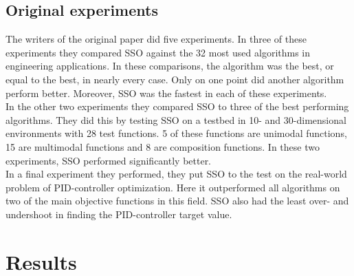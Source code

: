 \documentclass[runningheads]{llncs}
\begin{document}
\subsection{Original experiments}
The writers of the original paper did five experiments. In three of these experiments they compared SSO against the 32 most used algorithms in engineering applications. In these comparisons, the algorithm was the best, or equal to the best, in nearly every case. Only on one point did another algorithm perform better. Moreover, SSO was the fastest in each of these experiments. \\
In the other two experiments they compared SSO to three of the best performing algorithms. They did this by testing SSO on a testbed in 10- and 30-dimensional environments with 28 test functions. 5 of these functions are unimodal functions, 15 are multimodal functions and 8 are composition functions. In these two experiments, SSO performed significantly better.\\
In a final experiment they performed, they put SSO to the test on the real-world problem of PID-controller optimization. Here it outperformed all algorithms on two of the main objective functions in this field. SSO also had the least over- and undershoot in finding the PID-controller target value.



\section{Results}



\end{document}
